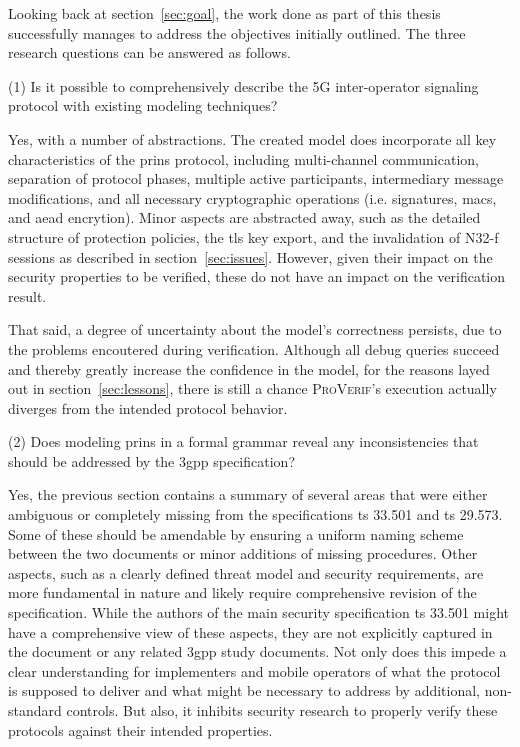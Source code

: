 Looking back at section~\ref{sec:goal}, the work done as part of this thesis successfully manages to address the objectives initially outlined.
The three research questions can be answered as follows.\bigskip

\noindent
(1) Is it possible to comprehensively describe the 5G inter-operator signaling protocol with existing modeling techniques?

Yes, with a number of abstractions.
The created model does incorporate all key characteristics of the \gls{prins} protocol, including multi-channel communication, separation of protocol phases, multiple active participants, intermediary message modifications, and all necessary cryptographic operations (i.e. signatures, \glspl{mac}, and \gls{aead} encrytion).
Minor aspects are abstracted away, such as the detailed structure of protection policies, the \gls{tls} key export, and the invalidation of N32-f sessions as described in section~\ref{sec:issues}.
However, given their impact on the security properties to be verified, these do not have an impact on the verification result.

That said, a degree of uncertainty about the model's correctness persists, due to the problems encoutered during verification.
Although all debug queries succeed and thereby greatly increase the confidence in the model, for the reasons layed out in section~\ref{sec:lessons}, there is still a chance \textsc{ProVerif}'s execution actually diverges from the intended protocol behavior.\bigskip

\noindent
(2) Does modeling \gls{prins} in a formal grammar reveal any inconsistencies that should be addressed by the \gls{3gpp} specification?

Yes, the previous section contains a summary of several areas that were either ambiguous or completely missing from the specifications \gls{ts} 33.501 and \gls{ts} 29.573.
Some of these should be amendable by ensuring a uniform naming scheme between the two documents or minor additions of missing procedures.
Other aspects, such as a clearly defined threat model and security requirements, are more fundamental in nature and likely require comprehensive revision of the specification.
While the authors of the main security specification \gls{ts} 33.501 might have a comprehensive view of these aspects, they are not explicitly captured in the document or any related \gls{3gpp} study documents.
Not only does this impede a clear understanding for implementers and mobile operators of what the protocol is supposed to deliver and what might be necessary to address by additional, non-standard controls.
But also, it inhibits security research to properly verify these protocols against their intended properties.

